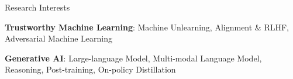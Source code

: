 \begin{rSection}{Research Interests}

\small{\textbf{Trustworthy Machine Learning}: Machine Unlearning, Alignment \& RLHF, Adversarial Machine Learning }

\small{\textbf{Generative AI}: Large-language Model, Multi-modal Language Model, Reasoning, Post-training, On-policy Distillation}

\vspace{-2mm}

\end{rSection}